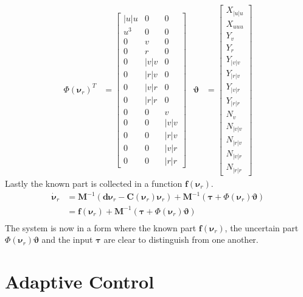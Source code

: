 \documentclass[12pt,a4]{article}
\begin{document}
\begin{align}
	\Phi(\bm{\nu}_r)^T & = \begin{bmatrix}
		|u|u & 0 & 0 \\ u^3 & 0 & 0 \\ 0& v &0 \\ 0& r &0 \\ 0&|v|v&0  \\ 0&|r|v&0  \\ 0&|v|r&0  \\ 0&|r|r&0  \\ 0&0& v \\ 0&0& |v|v \\ 0&0&|r|v \\ 0&0&|v|r \\ 0&0&|r|r
	\end{bmatrix}
	                   &
	\bm{\vartheta}     & = \begin{bmatrix}
		X_{|u|u} \\ X_{uuu} \\ Y_v \\ Y_r \\ Y_{|v|v} \\ Y_{|r|v} \\ Y_{|v|r} \\ Y_{|r|r} \\ N_v \\ N_{|v|v} \\ N_{|r|v} \\ N_{|v|r} \\ N_{|r|r}
	\end{bmatrix}
\end{align}
Lastly the known part is collected in a function $\bm{f}(\bm{\nu}_r)$.
\begin{align}
	\bm{\dot{\nu}}_r & = \bm{M}^{-1} (\bm{d} \bm{\nu}_r -\bm{C}(\bm{\nu}_r)\bm{\nu}_r) + \bm{M}^{-1} (\bm{\tau} + \Phi(\bm{\nu}_r )\bm{\vartheta}) \\
	                 & =  \bm{f}(\bm{\nu}_r) + \bm{M}^{-1} (\bm{\tau} + \Phi(\bm{\nu}_r )\bm{\vartheta})                                           \\
\end{align}
The system is now in a form where the known part $\bm{f}(\bm{\nu}_r)$, the uncertain part $\Phi(\bm{\nu}_r )\bm{\vartheta}$ and the input $\bm{\tau}$
are clear to distinguish from one another.

\section{Adaptive Control}
\end{document}
